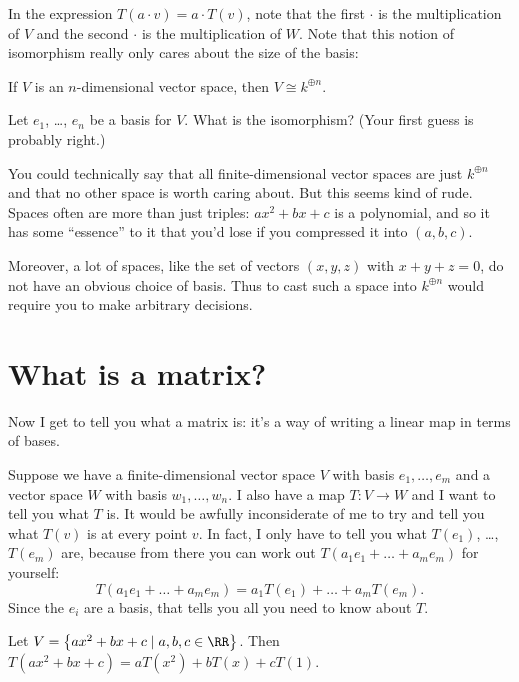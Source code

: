 In the expression $T(a \cdot v) = a \cdot T(v)$, note that the first $\cdot$ is the multiplication of $V$ and the second $\cdot$ is the multiplication of $W$.
Note that this notion of isomorphism really only cares about the size of the basis:
\begin{proposition}
	If $V$ is an $n$-dimensional vector space, then
	$V \cong k^{\oplus n}$.
\end{proposition}
\begin{ques}
	Let $e_1$, \dots, $e_n$ be a basis for $V$.
	What is the isomorphism?
	(Your first guess is probably right.)
\end{ques}
\begin{remark}
	You could technically say that all finite-dimensional vector
	spaces are just $k^{\oplus n}$ and that no other space is worth
	caring about.
	But this seems kind of rude.
	Spaces often are more than just triples: $ax^2+bx+c$ is a polynomial,
	and so it has some ``essence'' to it that you'd lose if you
	compressed it into $(a,b,c)$.

	Moreover, a lot of spaces, like the set of vectors $(x,y,z)$ with $x+y+z=0$,
	do not have an obvious choice of basis.
	Thus to cast such a space into $k^{\oplus n}$
	would require you to make arbitrary decisions.
\label{rem:vector_spaces_have_essence}
\end{remark}

\section{What is a matrix?}
Now I get to tell you what a matrix is:
it's a way of writing a linear map in terms of bases.

Suppose we have a finite-dimensional
vector space $V$ with basis $e_1, \dots, e_m$
and a vector space $W$ with basis $w_1, \dots, w_n$.
I also have a map $T \colon V \to W$ and I want to tell you what $T$ is.
It would be awfully inconsiderate of me to try and tell you what $T(v)$
is at every point $v$.
In fact, I only have to tell you what $T(e_1)$, \dots, $T(e_m)$ are,
because from there you can work out
$T(a_1 e_1 + \dots + a_m e_m)$ for yourself:
\[ T(a_1 e_1 + \dots + a_m e_m) = a_1 T(e_1) + \dots + a_m T(e_m). \]
Since the $e_i$ are a basis, that tells you all you need to know about $T$.
\begin{example}
	Let $V = \left\{ ax^2+bx+c \mid a,b,c \in \RR \right\}$.
	Then $T(ax^2+bx+c) = aT(x^2) + bT(x) + cT(1)$.
\end{example}

